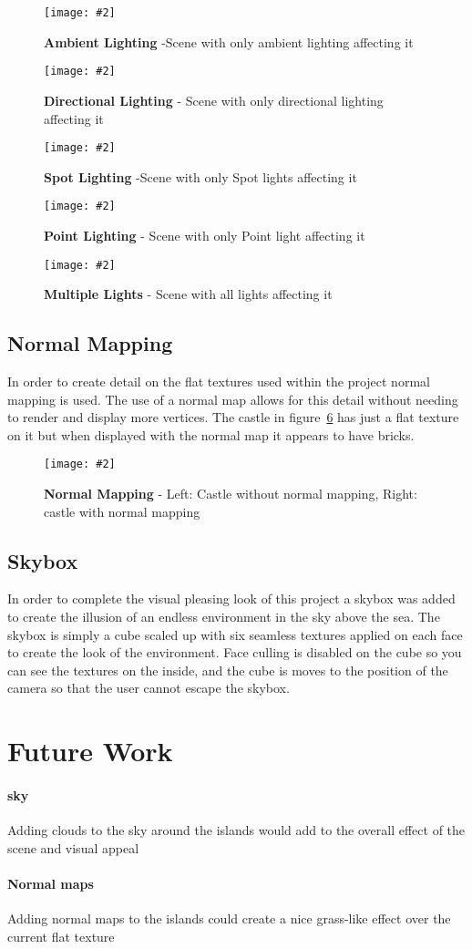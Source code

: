 \documentclass[10pt, a4paper]{article}
\newcommand{\figuremacro}[5]{
    \begin{figure}[#1]
        \centering
        \texttt{[image: \#2]}
        \caption[#3]{\textbf{#3}#4}
        \label{fig:#2}
    \end{figure}
}
\begin{document}
	 \figuremacro{h}{Ambient}{Ambient Lighting}{ -Scene with only ambient lighting affecting it}{1.0}
	 \figuremacro{h}{Directional}{Directional Lighting}{ - Scene with only directional lighting affecting it}{1.0}
	 \figuremacro{h}{Spot}{Spot Lighting}{ -Scene with only Spot lights affecting it}{1.0}
	 \figuremacro{h}{Point}{Point Lighting}{ - Scene with only Point light affecting it}{1.0}
	 \figuremacro{h}{Multiple}{Multiple Lights}{ - Scene with all lights affecting it}{1.0}
	 
	 \subsection{Normal Mapping}
	 In order to create detail on the flat textures used within the project normal mapping is used. The use of a normal map allows for this detail without needing to render and display more vertices. The castle in figure~\ref{fig:Normals} has just a flat texture on it but when displayed with the normal map it appears to have bricks.
	 
	 \figuremacro{h}{Normals}{Normal Mapping}{ - Left: Castle without normal mapping, Right: castle with normal mapping}{1.0}
	 
	 \subsection{Skybox}
	 In order to complete the visual pleasing look of this project a skybox was added to create the illusion of an endless environment in the sky above the sea. The skybox is simply a cube scaled up with six seamless textures applied on each face to create the look of the environment. Face culling is disabled on the cube so you can see the textures on the inside, and the cube is moves to the position of the camera so that the user cannot escape the skybox.
	
	\section{Future Work}
	\paragraph{sky}
	Adding clouds to the sky around the islands would add to the overall effect of the scene and visual appeal
	\paragraph{Normal maps}
	Adding normal maps to the islands could create a nice grass-like effect over the current flat texture
\end{document}
